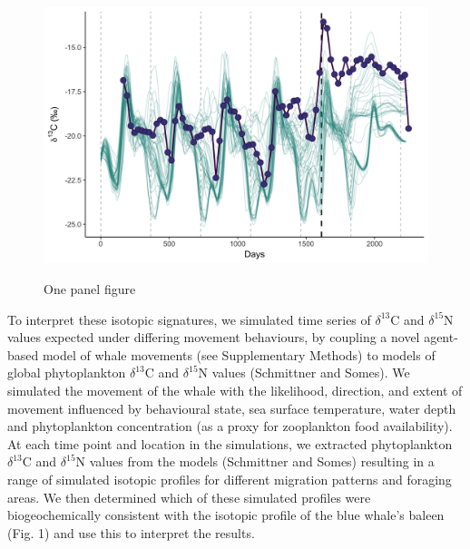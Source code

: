 \documentclass[a4paper,12pt]{article}
\begin{document}
\begin{figure}
  \centering
  \includegraphics[width = \linewidth]{figures/Figure-1c-migratory-model-d13C.png}
  \label{fig11c}
  \caption{One panel figure}
\end{figure}

 
To interpret these isotopic signatures, we simulated time series of $\delta^{13}$C and $\delta^{15}$N values expected under differing movement behaviours, by coupling a novel agent-based model of whale movements (see Supplementary Methods) to models of global phytoplankton $\delta^{13}$C and $\delta^{15}$N values\cite{magozzi2017using} (Schmittner and Somes). 
We simulated the movement of the whale with the likelihood, direction, and extent of movement influenced by behavioural state, sea surface temperature, water depth and phytoplankton concentration (as a proxy for zooplankton food availability). 
At each time point and location in the simulations, we extracted phytoplankton $\delta^{13}$C and $\delta^{15}$N values from the models\cite{magozzi2017using} (Schmittner and Somes) resulting in a range of simulated isotopic profiles for different migration patterns and foraging areas. 
We then determined which of these simulated profiles were biogeochemically consistent with the isotopic profile of the blue whale's baleen (Fig. 1) and use this to interpret the results.
 
\end{document}
